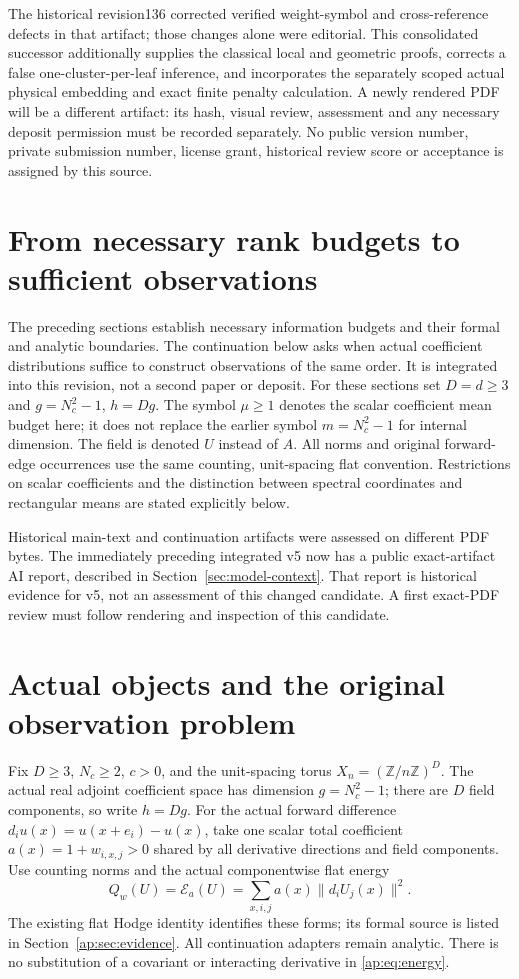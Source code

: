 \documentclass[11pt]{article}
\newcommand{\E}{\mathcal E}
\begin{document}
The historical revision136 corrected verified weight-symbol and cross-reference
defects in that artifact; those changes alone were editorial. This consolidated
successor additionally supplies the classical local and geometric proofs,
corrects a false one-cluster-per-leaf inference, and incorporates the separately
scoped actual physical embedding and exact finite penalty calculation. A newly rendered PDF will be a different
artifact: its hash, visual review, assessment and any necessary deposit permission
must be recorded separately. No public version number, private submission number,
license grant, historical review score or acceptance is assigned by this source.

\section{From necessary rank budgets to sufficient observations}
The preceding sections establish necessary information budgets and their
formal and analytic boundaries. The continuation below asks when actual
coefficient distributions suffice to construct observations of the same
order. It is integrated into this revision, not a second paper or deposit.
For these sections set $D=d\geq3$ and $g=N_c^2-1$, $h=Dg$.
The symbol $\mu\geq1$ denotes the scalar coefficient mean budget here;
it does not replace the earlier symbol $m=N_c^2-1$ for internal dimension.
The field is denoted $U$ instead of $A$. All norms and original forward-edge
occurrences use the same counting, unit-spacing flat convention. Restrictions
on scalar coefficients and the distinction between spectral coordinates and
rectangular means are stated explicitly below.

Historical main-text and continuation artifacts were assessed on different
PDF bytes. The immediately preceding integrated v5 now has a public exact-artifact
AI report, described in Section~\ref{sec:model-context}. That report is historical
evidence for v5, not an assessment of this changed candidate. A first exact-PDF
review must follow rendering and inspection of this candidate.
\section{Actual objects and the original observation problem}\label{ap:sec:objects}
Fix $D\geq3$, $N_c\geq2$, $c>0$, and the unit-spacing torus
$X_n=(\mathbb Z/n\mathbb Z)^D$. The actual real adjoint coefficient space has dimension
$g=N_c^2-1$; there are $D$ field components, so write $h=Dg$.
For the actual forward difference $d_i u(x)=u(x+e_i)-u(x)$, take one scalar total
coefficient $a(x)=1+w_{i,x,j}>0$ shared by all derivative directions and field components.
Use counting norms and the actual componentwise flat energy
\begin{equation}\label{ap:eq:energy}
 Q_w(U)=\E_a(U)=\sum_{x,i,j}a(x)\|d_iU_j(x)\|^2.
\end{equation}
The existing flat Hodge identity identifies these forms; its formal source is listed
in Section~\ref{ap:sec:evidence}. All continuation adapters remain analytic.
There is no substitution of a covariant or interacting derivative in \eqref{ap:eq:energy}.
\end{document}
